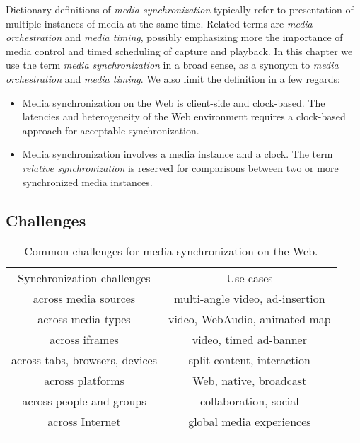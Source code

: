 Dictionary definitions of \emph{media synchronization} typically refer to
presentation of multiple instances of media at the same time. Related terms
are \emph{media orchestration} and \emph{media timing}, possibly emphasizing more the importance of
media control and timed scheduling of capture and playback. In this chapter we use
the term \emph{media synchronization} in a broad sense, as a synonym to
\emph{media orchestration} and \emph{media timing}. We also limit the
definition in a few regards:

\begin{itemize}
\item{Media synchronization on the Web is client-side and clock-based. The latencies and heterogeneity of the Web environment requires a clock-based approach for acceptable synchronization.}
\item{Media synchronization involves a media instance and a clock. The term \emph{relative synchronization} is reserved for comparisons between two or more synchronized media instances.}
\end{itemize}

\subsection{Challenges}


\begin{table}
\centering
\caption{Common challenges for media synchronization on the Web.}
\label{tab:challenges}
\setlength{\tabcolsep}{10pt}
\begin{tabular}{cc}
\hline\noalign{\smallskip}
Synchronization challenges & Use-cases \\
\noalign{\smallskip}\svhline\noalign{\smallskip}
across media sources & multi-angle video, ad-insertion \\
across media types & video, WebAudio, animated map \\
across iframes & video, timed ad-banner \\
across tabs, browsers, devices & split content, interaction \\
across platforms & Web, native, broadcast \\
across people and groups & collaboration, social \\
across Internet & global media experiences \\
\noalign{\smallskip}\hline\noalign{\smallskip}
\end{tabular}
\end{table} 



